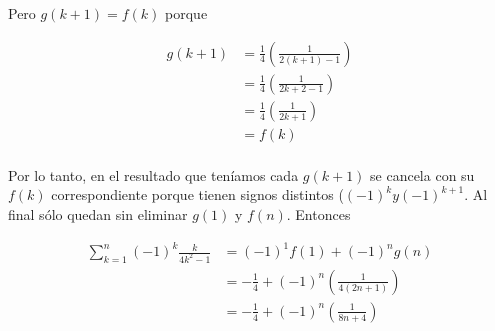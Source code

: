 \documentclass{article}
\begin{document}
Pero $g(k+1) = f(k)$ porque

\begin{align*}
g(k+1) & = \frac{1}{4} \left( \frac{1}{2(k+1)-1} \right) \\
       & = \frac{1}{4} \left( \frac{1}{2k+2-1} \right) \\
       & = \frac{1}{4} \left( \frac{1}{2k+1} \right) \\
       & = f(k) \\
\end{align*}

Por lo tanto, en el resultado que teníamos cada $g(k+1)$ se cancela con su $f(k)$ correspondiente
porque tienen signos distintos ($(-1)^k y (-1)^{k+1}$. Al final sólo quedan sin eliminar $g(1)$ y
$f(n)$. Entonces

\begin{align*}
\sum_{k=1}^n (-1)^k \frac{k}{4k^2-1} & = (-1)^1 f(1) + (-1)^n g(n) \\
                                     & = -\frac{1}{4} + (-1)^n \left( \frac{1}{4(2n+1)} \right) \\
                                     & = -\frac{1}{4} + (-1)^n \left( \frac{1}{8n+4} \right) \\
\end{align*}
\end{document}
